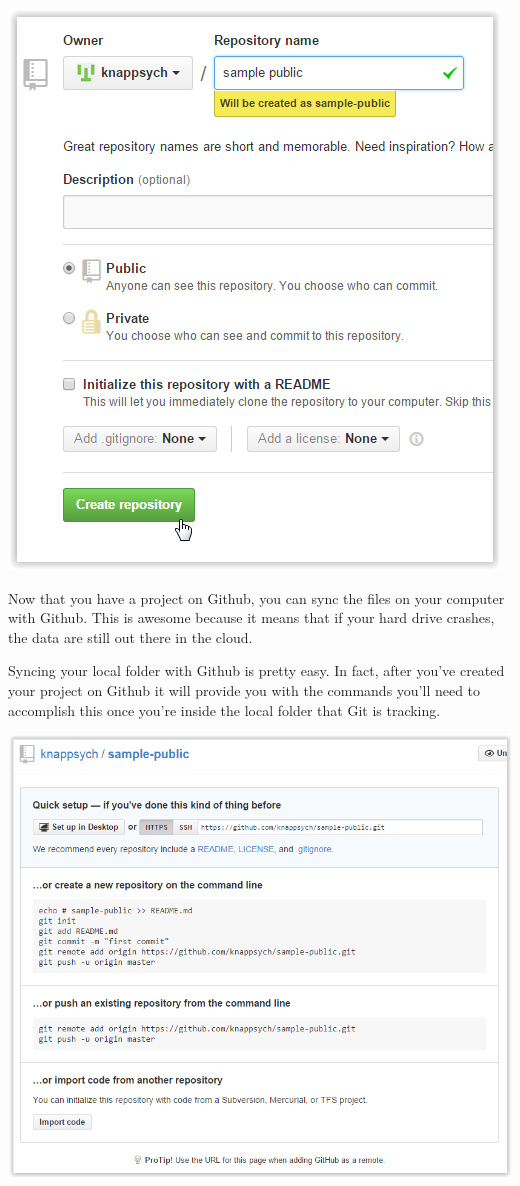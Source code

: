 \documentclass[12pt]{article}
\begin{document}
\includegraphics{imgs/Github03.PNG}

Now that you have a project on Github, you can sync the files on your computer with Github. This is
awesome because it means that if your hard drive crashes, the data are still out there in the cloud.

Syncing your local folder with Github is pretty easy. In fact, after you've created your project on
Github it will provide you with the commands you'll need to accomplish this once you're inside the
local folder that Git is tracking.

\includegraphics{imgs/Github04.PNG}
\end{document}
